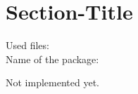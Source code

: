 \section{Section-Title}
%
\begin{description}
\item[Used files:] 
\item[Name of the package:] 
\end{description}
%
Not implemented yet.
